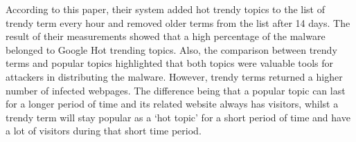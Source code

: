 According to this paper, their system added hot trendy topics to the list of trendy term every hour and removed older terms from the list after 14 days. The result of their measurements showed that a high percentage of the malware belonged to Google Hot trending topics. Also, the comparison between trendy terms and popular topics highlighted that both topics were valuable tools for attackers in distributing the malware. However, trendy terms returned a higher number of infected webpages. The difference being that a popular topic can last for a longer period of time and its related website always has visitors, whilst a trendy term will stay popular as a ‘hot topic’ for a short period of time and have a lot of visitors during that short time period\cite{moore2011fashion}.